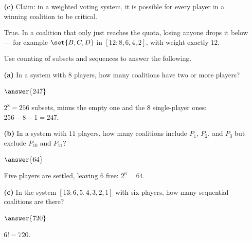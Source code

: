 \documentclass[12pt]{ximera}
\begin{document}
\begin{problem}
\begin{prompt}
\textbf{(c)} Claim: in a weighted voting system, it is possible for every player in a
winning coalition to be critical.

\begin{multipleChoice}
\end{multipleChoice}

\begin{feedback}
True. In a coalition that only just reaches the quota, losing anyone drops it below ---
for example $\set{B,C,D}$ in $[12:8,6,4,2]$, with weight exactly $12$.
\end{feedback}
\end{prompt}
\end{problem}

\begin{problem}
Use counting of subsets and sequences to answer the following.

\begin{prompt}
\textbf{(a)} In a system with $8$ players, how many coalitions have two or more
players?

$\answer{247}$

\begin{feedback}
$2^8=256$ subsets, minus the empty one and the $8$ single-player ones:
$256-8-1=247$.
\end{feedback}
\end{prompt}

\begin{prompt}
\textbf{(b)} In a system with $11$ players, how many coalitions include $P_1$, $P_2$,
and $P_3$ but exclude $P_{10}$ and $P_{11}$?

$\answer{64}$

\begin{feedback}
Five players are settled, leaving $6$ free: $2^6=64$.
\end{feedback}
\end{prompt}

\begin{prompt}
\textbf{(c)} In the system $[13:6,5,4,3,2,1]$ with six players, how many sequential
coalitions are there?

$\answer{720}$

\begin{feedback}
$6!=720$.
\end{feedback}
\end{prompt}
\end{problem}
\end{document}

